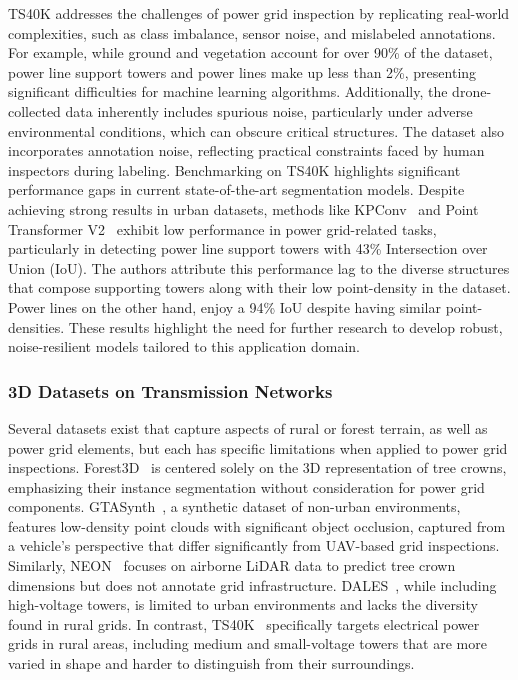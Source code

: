 TS40K addresses the challenges of power grid inspection by replicating real-world complexities, such as class imbalance, sensor noise, and mislabeled annotations. For example, while ground and vegetation account for over 90\% of the dataset, power line support towers and power lines make up less than 2\%, presenting significant difficulties for machine learning algorithms. 
Additionally, the drone-collected data inherently includes spurious noise, particularly under adverse environmental conditions, which can obscure critical structures. 
The dataset also incorporates annotation noise, reflecting practical constraints faced by human inspectors during labeling.
%
Benchmarking on TS40K highlights significant performance gaps in current state-of-the-art segmentation models. 
Despite achieving strong results in urban datasets, methods like KPConv~\cite{thomas2019kpconv} and Point Transformer V2~\cite{wu2022point} exhibit low performance in power grid-related tasks, particularly in detecting power line support towers with 43\% Intersection over Union (IoU).
The authors attribute this performance lag to the diverse structures that compose supporting towers along with their low point-density in the dataset. Power lines on the other hand, enjoy a 94\% IoU despite having similar point-densities.
These results highlight the need for further research to develop robust, noise-resilient models tailored to this application domain.


\subsubsection{3D Datasets on Transmission Networks}
Several datasets exist that capture aspects of rural or forest terrain, as well as power grid elements, but each has specific limitations when applied to power grid inspections. Forest3D~\cite{trochta20173d} is centered solely on the 3D representation of tree crowns, emphasizing their instance segmentation without consideration for power grid components. 
%
GTASynth~\cite{curnis2022gtasynth}, a synthetic dataset of non-urban environments, features low-density point clouds with significant object occlusion, captured from a vehicle’s perspective that differ significantly from UAV-based grid inspections. 
Similarly, NEON~\cite{marconi2019data} focuses on airborne LiDAR data to predict tree crown dimensions but does not annotate grid infrastructure. DALES~\cite{varney2020dales}, while including high-voltage towers, is limited to urban environments and lacks the diversity found in rural grids.
%
In contrast, TS40K~\cite{lavado2024ts40k} specifically targets electrical power grids in rural areas, including medium and small-voltage towers that are more varied in shape and harder to distinguish from their surroundings.

